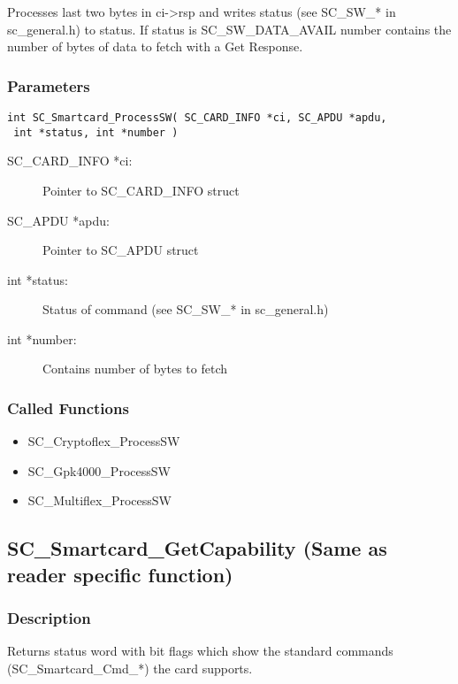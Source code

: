\documentclass[a4paper,oneside]{article}
\begin{document}
Processes last two bytes in ci->rsp and writes status (see SC\_SW\_*
in sc\_general.h) to status. If status is SC\_SW\_DATA\_AVAIL number
contains the number of bytes of data to fetch with a Get Response.

\subsubsection*{Parameters}

\begin{verbatim}
int SC_Smartcard_ProcessSW( SC_CARD_INFO *ci, SC_APDU *apdu,
 int *status, int *number )
\end{verbatim}

\begin{description}
\item[SC\_CARD\_INFO *ci:] Pointer to SC\_CARD\_INFO struct
\item[SC\_APDU *apdu:] Pointer to SC\_APDU struct
\item[int *status:] Status of command (see SC\_SW\_* in sc\_general.h)
\item[int *number:] Contains number of bytes to fetch
\end{description}

\subsubsection*{Called Functions}

\begin{itemize}
\item SC\_Cryptoflex\_ProcessSW
\item SC\_Gpk4000\_ProcessSW
\item SC\_Multiflex\_ProcessSW
\end{itemize}


\subsection{SC\_Smartcard\_GetCapability (Same as reader specific function)}

\subsubsection*{Description}

Returns status word with bit flags which show the standard commands
(SC\_Smartcard\_Cmd\_*) the card supports.
\end{document}
